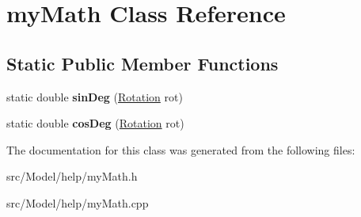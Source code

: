 \hypertarget{classmyMath}{}\section{my\+Math Class Reference}
\label{classmyMath}
\subsection*{Static Public Member Functions}
\begin{DoxyCompactItemize}
\item 
static double {\bfseries sin\+Deg} (\hyperlink{classRotation}{Rotation} rot)\hypertarget{classmyMath_a90d7917c9820d5c937b962a4bdae2df5}{}\label{classmyMath_a90d7917c9820d5c937b962a4bdae2df5}

\item 
static double {\bfseries cos\+Deg} (\hyperlink{classRotation}{Rotation} rot)\hypertarget{classmyMath_ae5df9737f164223e185efcf121c07d4b}{}\label{classmyMath_ae5df9737f164223e185efcf121c07d4b}

\end{DoxyCompactItemize}


The documentation for this class was generated from the following files\+:\begin{DoxyCompactItemize}
\item 
src/\+Model/help/my\+Math.\+h\item 
src/\+Model/help/my\+Math.\+cpp\end{DoxyCompactItemize}
